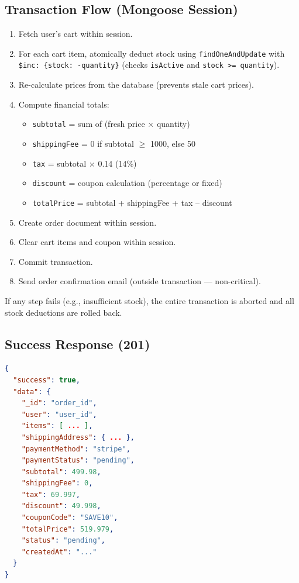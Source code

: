 \subsection*{Transaction Flow (Mongoose Session)}
\begin{enumerate}
  \item Fetch user's cart within session.
  \item For each cart item, atomically deduct stock using \texttt{findOneAndUpdate} with \texttt{\$inc: \{stock: -quantity\}} (checks \texttt{isActive} and \texttt{stock >= quantity}).
  \item Re-calculate prices from the database (prevents stale cart prices).
  \item Compute financial totals:
    \begin{itemize}
      \item \texttt{subtotal} = sum of (fresh price $\times$ quantity)
      \item \texttt{shippingFee} = 0 if subtotal $\geq$ 1000, else 50
      \item \texttt{tax} = subtotal $\times$ 0.14 (14\%)
      \item \texttt{discount} = coupon calculation (percentage or fixed)
      \item \texttt{totalPrice} = subtotal + shippingFee + tax -- discount
    \end{itemize}
  \item Create order document within session.
  \item Clear cart items and coupon within session.
  \item Commit transaction.
  \item Send order confirmation email (outside transaction --- non-critical).
\end{enumerate}

\begin{warningbox}
If any step fails (e.g., insufficient stock), the entire transaction is aborted and all stock deductions are rolled back.
\end{warningbox}

\subsection*{Success Response (201)}
\begin{lstlisting}[language=json]
{
  "success": true,
  "data": {
    "_id": "order_id",
    "user": "user_id",
    "items": [ ... ],
    "shippingAddress": { ... },
    "paymentMethod": "stripe",
    "paymentStatus": "pending",
    "subtotal": 499.98,
    "shippingFee": 0,
    "tax": 69.997,
    "discount": 49.998,
    "couponCode": "SAVE10",
    "totalPrice": 519.979,
    "status": "pending",
    "createdAt": "..."
  }
}
\end{lstlisting}

